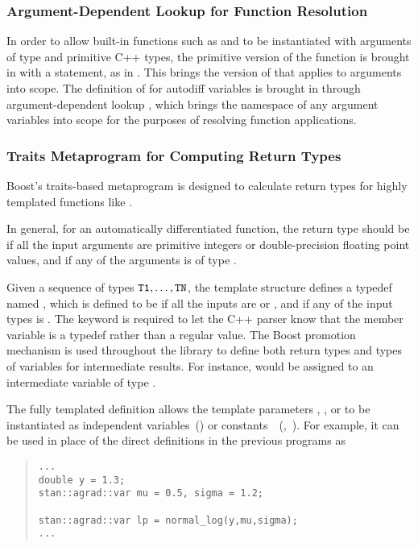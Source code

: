 \documentclass[10pt]{article}
\begin{document}
\subsubsection{Argument-Dependent Lookup for Function Resolution}

In order to allow built-in functions such as  and
 to be instantiated with arguments of type
 and primitive C++ types, the primitive version of
the function is brought in with a  statement, as in
.  This brings the version of  that
applies to  arguments into scope.  The definition of
 for autodiff variables  is brought in
through argument-dependent lookup
\cite[Section~3.4]{cpp-standard:2003}, which brings the namespace of
any argument variables into scope for the purposes of resolving
function applications.


\subsubsection{Traits Metaprogram for Computing Return Types}

Boost's traits-based metaprogram 
\citep{Boost:2011} is designed to calculate return types for highly
templated functions like .

In general, for an automatically differentiated function, the return
type should be  if all the input arguments are primitive
integers or double-precision floating point values, and
 if any of the arguments is of type
.

Given a sequence of types ${\tt T1}, \ldots, {\tt TN}$, the template
structure  defines a typedef named
, which is defined to be  if all the inputs
are  or , and  if any of the
input types is .  The keyword  is
required to let the C++ parser know that the member variable is a
typedef rather than a regular value.  The Boost promotion mechanism is
used throughout the  library to define both return
types and types of variables for intermediate results.  For instance,
 would be assigned to an intermediate variable of type
.

The fully templated definition allows the template parameters
, , or  to be instantiated as independent
variables\, \mbox{\rm ()} or constants\, \mbox{\rm
  (, )}.  For example, it can be used in place
of the direct definitions in the previous programs as
%
\begin{quote}
\begin{Verbatim}
...
double y = 1.3;
stan::agrad::var mu = 0.5, sigma = 1.2;

stan::agrad::var lp = normal_log(y,mu,sigma);
...
\end{Verbatim}
\end{quote}
\end{document}
